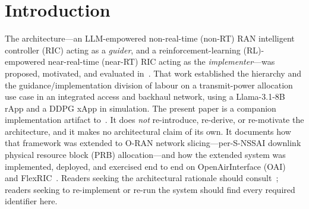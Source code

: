 \section{Introduction}
The \systemname{} architecture---an LLM-empowered non-real-time (non-RT) RAN intelligent controller (RIC) acting as a \emph{guider}, and a reinforcement-learning (RL)-empowered near-real-time (near-RT) RIC acting as the \emph{implementer}---was proposed, motivated, and evaluated in~\cite{bao2026llmhric}. That work established the hierarchy and the guidance/implementation division of labour on a transmit-power allocation use case in an integrated access and backhaul network, using a Llama-3.1-8B rApp and a DDPG xApp in simulation. The present paper is a companion implementation artifact to~\cite{bao2026llmhric}. It does \emph{not} re-introduce, re-derive, or re-motivate the architecture, and it makes no architectural claim of its own. It documents how that framework was extended to O-RAN network slicing---per-S-NSSAI downlink physical resource block (PRB) allocation---and how the extended system was implemented, deployed, and exercised end to end on OpenAirInterface (OAI)~\cite{oai2026} and FlexRIC~\cite{flexric2026}. Readers seeking the architectural rationale should consult~\cite{bao2026llmhric}; readers seeking to re-implement or re-run the system should find every required identifier here.

